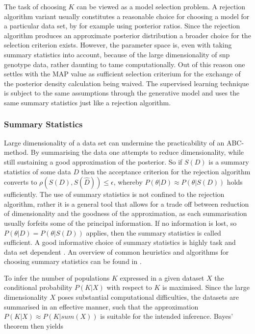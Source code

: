 \documentclass[a4paper, 11pt]{article}
\begin{document}
The task of choosing $K$ can be viewed as a model selection problem. A rejection algorithm variant usually constitutes a reasonable choice for choosing a model for a particular data set, by for example using posterior ratios. Since the rejection algorithm produces an approximate posterior distribution a broader choice for the selection criterion exists. However, the parameter space is, even with taking summary statistics into account, because of the large dimensionality of snp genotype data, rather daunting to tame computationally. Out of this reason one settles with the MAP value as sufficient selection criterium for the exchange of the posterior density calculation being waived. The supervised learning technique is subject to the same assumptions through the generative model and uses the same summary statistics just like a rejection algorithm.\\

\subsubsection{Summary Statistics}
Large dimensionality of a data set can undermine the practicability of an ABC-method. By summarising the data one attempts to reduce dimensionality, while still sustaining a good approximation of the posterior. So if $S(D)$ is a summary statistics of some data $D$ then the acceptance criterion for the rejection algorithm converts to $\rho(S(D), S(\hat{D})) \le \epsilon$, whereby $P(\theta|D) \approx P(\theta|S(D))$ holds sufficiently. The use of summary statistics is not confined to the rejection algorithm, rather it is a general tool that allows for a trade off between reduction of dimensionality and the goodness of the approximation, as each summarisation usually forfeits some of the principal information. If no information is lost, so $P(\theta | D) = P(\theta| S(D))$ applies, then the summary statistics is called sufficient. A good informative choice of summary statistics is highly task and data set dependent \cite{nunes2010optimal}. An overview of common heuristics and algorithms for choosing summary statistics can be found in \cite{blum2013comparative}.

To infer the number of populations $K$ expressed in a given dataset $X$ the conditional probability $P(K | X)$ with respect to $K$ is maximised. Since the large dimensionality $X$ poses substantial computational difficulties, the datasets are summarised  in an effective manner, such that the approximation $P(K|X) \approx P(K | sum(X))$ is suitable for the intended inference. Bayes' theorem then yields
\end{document}
